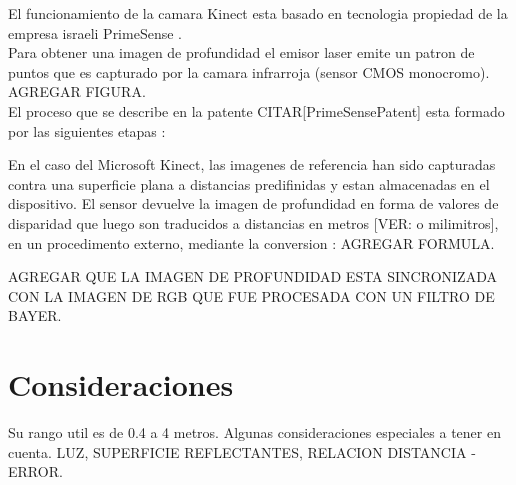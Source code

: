 El funcionamiento de la camara Kinect esta basado en tecnologia propiedad de la empresa israeli PrimeSense \cite{primesense}. \\
Para obtener una imagen de profundidad el emisor laser emite un patron de puntos que es capturado por la camara infrarroja (sensor CMOS monocromo). AGREGAR FIGURA. \\
El proceso que se describe en la patente CITAR[PrimeSensePatent] esta formado por las siguientes etapas :

En el caso del Microsoft Kinect, las imagenes de referencia han sido capturadas contra una superficie plana a distancias predifinidas y estan almacenadas en el dispositivo. El sensor devuelve la imagen de profundidad en forma de valores de disparidad que luego son traducidos a distancias en metros [VER: o milimitros], en un procedimento externo, mediante la conversion : AGREGAR FORMULA.

AGREGAR QUE LA IMAGEN DE PROFUNDIDAD ESTA SINCRONIZADA CON LA IMAGEN DE RGB QUE FUE PROCESADA CON UN FILTRO DE BAYER.


\section{Consideraciones}
\label{sec:consideraciones-kinect}

Su rango util es de 0.4 a 4 metros.
Algunas consideraciones especiales a tener en cuenta. LUZ, SUPERFICIE REFLECTANTES, RELACION DISTANCIA - ERROR.